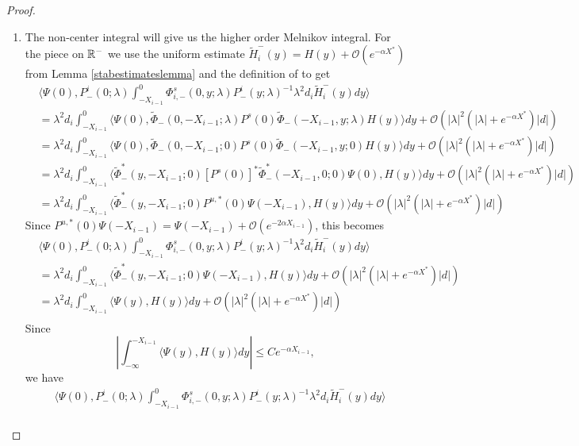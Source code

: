 \documentclass[thesis.tex]{subfiles}
\begin{document}
\begin{lemma}
\begin{proof}
\begin{enumerate}
\item The non-center integral will give us the higher order Melnikov integral. For the piece on $\mathbb{R}^-$ we use the uniform estimate $\tilde{H}_i^-(y) = H(y) + \mathcal{O}(e^{-\alpha X^*})$ from Lemma \ref{stabestimateslemma} and the definition of    to get
\begin{align*}
&\langle \Psi(0), P^i_-(0; \lambda) \int_{-X_{i-1}}^0 \Phi^s_{i,-}(0, y; \lambda) P^i_-(y; \lambda)^{-1} \lambda^2 d_i \tilde{H}_i^-(y) dy \rangle \\
&= \lambda^2 d_i \int_{-X_{i-1}}^0 \langle \Psi(0), \tilde{\Phi}_-(0, -X_{i-1}; \lambda) 
P^s(0) \tilde{\Phi}_-(-X_{i-1}, y; \lambda) H(y) \rangle dy + \mathcal{O}(|\lambda|^2( |\lambda| + {e^{-\alpha X^*}})|d|) \\
&= \lambda^2 d_i \int_{-X_{i-1}}^0 \langle \Psi(0), \tilde{\Phi}_-(0, -X_{i-1}; 0) 
P^s(0) \tilde{\Phi}_-(-X_{i-1}, y; 0) H(y) \rangle dy + \mathcal{O}(|\lambda|^2( |\lambda| + {e^{-\alpha X^*}})|d|) \\
&= \lambda^2 d_i \int_{-X_{i-1}}^0 \langle \tilde{\Phi}^*_-(y, -X_{i-1}; 0) [P^s(0)]^* \tilde{\Phi}^*_-(-X_{i-1}, 0; 0) \Psi(0), H(y) \rangle dy + \mathcal{O}(|\lambda|^2( |\lambda| + {e^{-\alpha X^*}})|d|) \\
&= \lambda^2 d_i \int_{-X_{i-1}}^0 \langle \tilde{\Phi}^*_-(y, -X_{i-1}; 0) P^{u,*}(0) \Psi(-X_{i-1}), H(y) \rangle dy + \mathcal{O}(|\lambda|^2( |\lambda| + {e^{-\alpha X^*}})|d|)
\end{align*}
Since $P^{u,*}(0) \Psi(-X_{i-1}) = \Psi(-X_{i-1}) + \mathcal{O}(e^{-2\alpha X_{i-1}})$, this becomes
\begin{align*}
&\langle \Psi(0), P^i_-(0; \lambda) \int_{-X_{i-1}}^0 \Phi^s_{i,-}(0, y; \lambda) P^i_-(y; \lambda)^{-1} \lambda^2 d_i \tilde{H}_i^-(y) dy \rangle \\
&= \lambda^2 d_i \int_{-X_{i-1}}^0 \langle \tilde{\Phi}^*_-(y, -X_{i-1}; 0) \Psi(-X_{i-1}), H(y) \rangle dy + \mathcal{O}(|\lambda|^2( |\lambda| + {e^{-\alpha X^*}})|d|) \\
&= \lambda^2 d_i \int_{-X_{i-1}}^0 \langle \Psi(y), H(y) \rangle dy + \mathcal{O}(|\lambda|^2( |\lambda| + {e^{-\alpha X^*}})|d|) \\
\end{align*}
Since 
\[
\left| \int_{-\infty}^{-X_{i-1}} \langle \Psi(y), H(y) \rangle dy \right| \leq C e^{-\alpha X_{i-1}},
\]
we have
\begin{align*}
&\langle \Psi(0), P^i_-(0; \lambda) \int_{-X_{i-1}}^0 \Phi^s_{i,-}(0, y; \lambda) P^i_-(y; \lambda)^{-1} \lambda^2 d_i \tilde{H}_i^-(y) dy \rangle \\

\end{align*}
\end{enumerate}
\end{proof}
\end{lemma}
\end{document}
